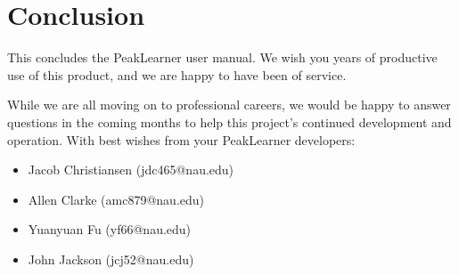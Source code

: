 \documentclass[a4paper,12pt]{article}
\begin{document}
\newpage

\section{Conclusion}
This concludes the PeakLearner user manual. We wish you years of productive use of this product, and we are happy to have been of service.

While we are all moving on to professional careers, we would be happy to answer questions in the coming months to help this project's continued development and operation. With best wishes from your PeakLearner developers:
	\begin{itemize}
		\item Jacob Christiansen (jdc465@nau.edu)
		\item Allen Clarke (amc879@nau.edu)
		\item Yuanyuan Fu (yf66@nau.edu)
		\item John Jackson (jcj52@nau.edu)
	\end{itemize}
\end{document}

